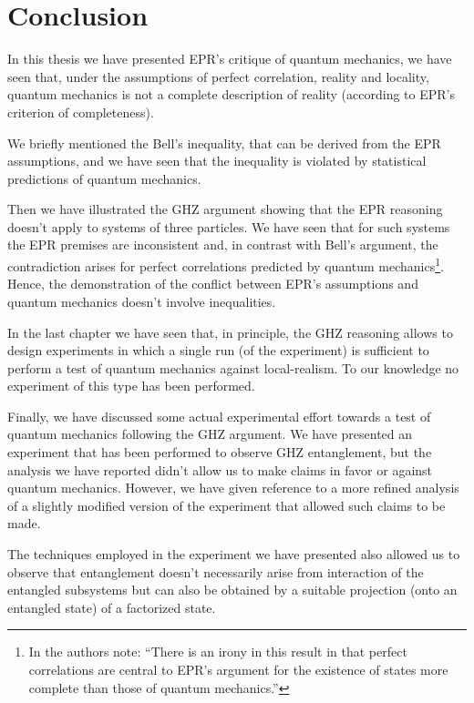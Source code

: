 \chapter*{Conclusion}
In this thesis we have presented EPR's critique of quantum mechanics, we have seen that, under the assumptions of perfect correlation, reality and locality, quantum mechanics is not a complete description of reality (according to EPR's criterion of completeness).

We briefly mentioned the Bell's inequality, that can be derived from the EPR assumptions, and we have seen that the inequality is violated by statistical predictions of quantum mechanics.

Then we have illustrated the GHZ argument showing that the EPR reasoning doesn't apply to systems of three particles. We have seen that for such systems the EPR premises are inconsistent and, in contrast with Bell's argument, the contradiction arises for perfect correlations predicted by quantum mechanics\footnote{In \cite{:/content/aapt/journal/ajp/58/12/10.1119/1.16243} the authors note: ``There is an irony in this result in that perfect correlations are central to EPR's argument for the existence of states more complete than those of quantum mechanics.''}. Hence, the demonstration of the conflict between EPR's assumptions and quantum mechanics doesn't involve inequalities.

In the last chapter we have seen that, in principle, the GHZ reasoning allows to design experiments in which a single run (of the experiment) is sufficient to perform a test of quantum mechanics against local-realism. To our knowledge no experiment of this type has been performed.

Finally, we have discussed some actual experimental effort towards a test of quantum mechanics following the GHZ argument. We have presented an experiment that has been performed to observe GHZ entanglement, but the analysis we have reported didn't allow us to make claims in favor or against quantum mechanics. However, we have given reference to a more refined analysis of a slightly modified version of the experiment that allowed such claims to be made.

The techniques employed in the experiment we have presented also allowed us to observe that entanglement doesn't necessarily arise from interaction of the entangled subsystems but can also be obtained by a suitable projection (onto an entangled state) of a factorized state.
